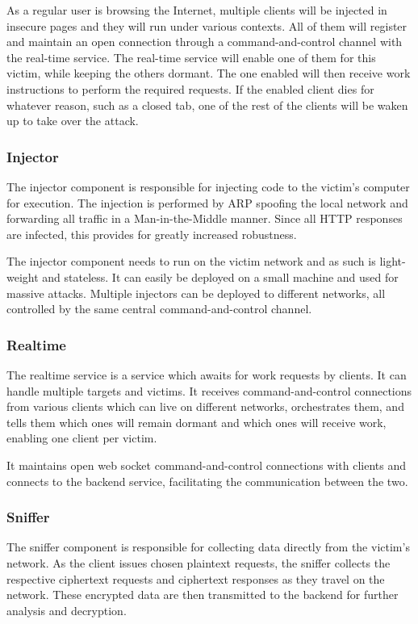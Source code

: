 \documentclass{sig-alternate-05-2015}
\begin{document}
As a regular user is browsing the Internet, multiple clients will be
injected in insecure pages and they will run under various contexts. All of
them will register and maintain an open connection through a
command-and-control channel with the real-time service. The real-time
service will enable one of them for this victim, while keeping the others
dormant. The one enabled will then receive work instructions to perform the
required requests. If the enabled client dies for whatever reason, such as a
closed tab, one of the rest of the clients will be waken up to take over the
attack.

\subsubsection{Injector}

The injector component is responsible for injecting code to the victim's
computer for execution. The injection is performed by ARP spoofing the local
network and forwarding all traffic in a Man-in-the-Middle manner. Since all HTTP
responses are infected, this provides for greatly increased robustness.

The injector component needs to run on the victim network and as such is
light-weight and stateless. It can easily be deployed on a small machine and
used for massive attacks. Multiple injectors can be deployed to different
networks, all controlled by the same central command-and-control channel.

\subsubsection{Realtime}

The realtime service is a service which awaits for work requests by clients. It
can handle multiple targets and victims. It receives command-and-control
connections from various clients which can live on different networks,
orchestrates them, and tells them which ones will remain dormant and which ones
will receive work, enabling one client per victim.

It maintains open web socket command-and-control connections with clients and
connects to the backend service, facilitating the communication between the two.

\subsubsection{Sniffer}

The sniffer component is responsible for collecting data directly from the
victim's network. As the client issues chosen plaintext requests, the sniffer
collects the respective ciphertext requests and ciphertext responses as they
travel on the network. These encrypted data are then transmitted to the backend
for further analysis and decryption.
\end{document}

